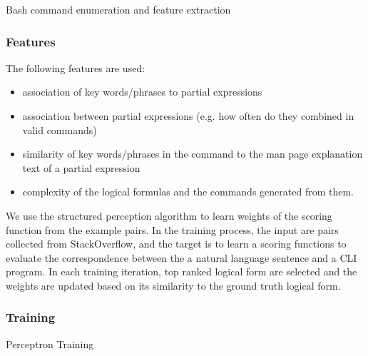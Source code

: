 \begin{algorithm} 
\label{alg:decoding}
\caption{Bash command enumeration and feature extraction}
\end{algorithm}

\subsubsection{Features}
\label{subsec:feature}
The following features are used:
\begin{itemize}\itemsep-1pt
	\item association of key words/phrases to partial expressions
	\item association between partial expressions (e.g. how often do they combined in valid commands)
	\item similarity of key words/phrases in the command to the man page explanation text of a partial expression
	\item complexity of the logical formulas and the commands generated from them.
\end{itemize}
We use the structured perception algorithm to learn weights of the scoring function from the example pairs. In the training process, the input are pairs collected from StackOverflow, and the target is to learn a scoring functions to evaluate the correspondence between the a natural language sentence and a CLI program. In each training iteration, top ranked logical form are selected and the weights are updated based on its similarity to the ground truth logical form. 

\subsubsection{Training}
\label{subsec:training}

\begin{algorithm} 
\label{alg:training}
\caption{Perceptron Training}
\end{algorithm}